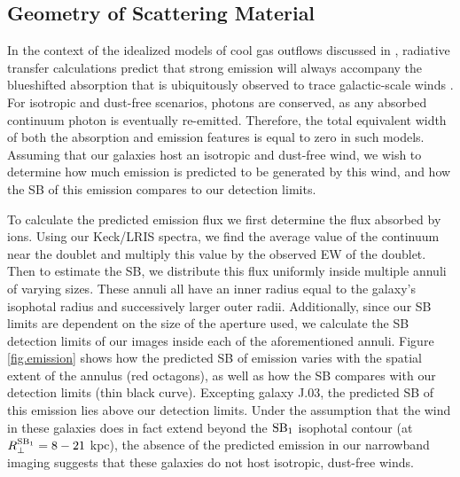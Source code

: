 \documentclass[twocolumn]{aastex62}
\begin{document}
\subsection{Geometry of Scattering Material}
In the context of the idealized models of cool gas outflows discussed in \cite{Prochaska_2011}, radiative transfer calculations predict that strong  emission will always accompany the blueshifted  absorption that is ubiquitously observed to trace galactic-scale winds \citep{Weiner2009,Martin2012,Rubin_2014}. For isotropic and dust-free scenarios, photons are conserved, as any absorbed continuum photon is eventually re-emitted.  Therefore, the total equivalent width of both the absorption and emission features is equal to zero in such models. Assuming that our galaxies host an isotropic and dust-free wind, we wish to determine how much emission is predicted to be generated by this wind, and how the SB of this emission compares to our detection limits.

To calculate the predicted emission flux we first determine the flux absorbed by  ions. Using our Keck/LRIS spectra, we find the average value of the continuum near the  doublet and multiply this value by the observed EW of the doublet. Then to estimate the SB, we distribute this flux uniformly inside multiple annuli of varying sizes. These annuli all have an inner radius equal to the galaxy's isophotal radius and successively larger outer radii.  Additionally, since our SB limits are dependent on the size of the aperture used, we calculate the SB detection limits of our images inside each of the aforementioned annuli. Figure \ref{fig.emission} shows how the predicted SB of emission varies with the spatial extent of the annulus (red octagons), as well as how the SB compares with our detection limits (thin black curve). Excepting galaxy J.03, the predicted SB of this emission lies above our detection limits. 
Under the assumption that the wind in these galaxies does in fact extend beyond the $\rm SB_1$ isophotal contour (at $R_{\perp}^{\rm{SB}_1} = 8-21$ kpc), the absence of the predicted emission %
in our narrowband imaging suggests that these galaxies do not host isotropic, dust-free winds.  
\end{document}
